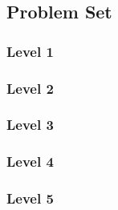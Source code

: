 \documentclass{article}
\begin{document}
\subsection{Problem Set}
\subsubsection{Level 1}
\subsubsection{Level 2}
\subsubsection{Level 3}
\subsubsection{Level 4}
\subsubsection{Level 5}
\pagebreak
\end{document}
